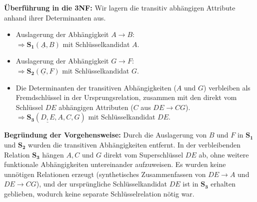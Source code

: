 \documentclass[12pt]{scrartcl}
\begin{document}
\textbf{Überführung in die 3NF:}
Wir lagern die transitiv abhängigen Attribute anhand ihrer Determinanten aus.
\begin{itemize}
    \item Auslagerung der Abhängigkeit $A \rightarrow B$: \\
    $\Rightarrow \mathbf{S_1}(\underline{A}, B)$ mit Schlüsselkandidat $A$.
    \item Auslagerung der Abhängigkeit $G \rightarrow F$: \\
    $\Rightarrow \mathbf{S_2}(\underline{G}, F)$ mit Schlüsselkandidat $G$.
    \item Die Determinanten der transitiven Abhängigkeiten ($A$ und $G$) verbleiben als Fremdschlüssel in der Ursprungsrelation, zusammen mit den direkt vom Schlüssel $DE$ abhängigen Attributen ($C$ aus $DE \rightarrow CG$). \\
    $\Rightarrow \mathbf{S_3}(\underline{D, E}, A, C, G)$ mit Schlüsselkandidat $DE$.
\end{itemize}

\textbf{Begründung der Vorgehensweise:}
Durch die Auslagerung von $B$ und $F$ in $\mathbf{S_1}$ und $\mathbf{S_2}$ wurden die transitiven Abhängigkeiten entfernt. In der verbleibenden Relation $\mathbf{S_3}$ hängen $A, C$ und $G$ direkt vom Superschlüssel $DE$ ab, ohne weitere funktionale Abhängigkeiten untereinander aufzuweisen. Es wurden keine unnötigen Relationen erzeugt (synthetisches Zusammenfassen von $DE \rightarrow A$ und $DE \rightarrow CG$), und der ursprüngliche Schlüsselkandidat $DE$ ist in $\mathbf{S_3}$ erhalten geblieben, wodurch keine separate Schlüsselrelation nötig war.
\end{document}
